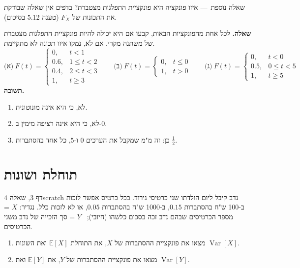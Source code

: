 \documentclass[11pt,a4paper]{report}
\newcommand{\E}{\mathbb{E}}
\DeclareMathOperator{\Var}{Var}
\newcommand{\dash}{{\rmfamily —}}
\begin{document}
\begin{suggestion}{שאלה נוספת~\dash{} איזו פונקציה היא פונקציית התפלגות מצטברת?}
בדפים אין שאלה שבודקת את התכונות של $F_X$ (טענה 5.12 בסיכום).

\textbf{שאלה.} לכל אחת מהפונקציות הבאות, קבעו אם היא יכולה להיות פונקציית התפלגות מצטברת של משתנה מקרי. אם לא, נמקו איזו תכונה לא מתקיימת.
\[
  \text{(א)}\ F(t)=\begin{cases}0,&t<1\\ 0.6,&1\le t<2\\ 0.4,&2\le t<3\\ 1,&t\ge3\end{cases}
  \qquad
  \text{(ב)}\ F(t)=\begin{cases}0,&t\le0\\ 1,&t>0\end{cases}
  \qquad
  \text{(ג)}\ F(t)=\begin{cases}0,&t<0\\ 0.5,&0\le t<5\\ 1,&t\ge5\end{cases}
\]
\textbf{תשובה.}
\begin{enumerate}[label=(\alph*),itemsep=1pt,topsep=2pt]
  \item לא, כי היא אינה מונוטונית.
  \item לא, כי היא אינה רציפה מימין ב-$0$.
  \item כן: זה מ"מ שמקבל את הערכים $0$ ו-$5$, כל אחד בהסתברות $\frac12$.
\end{enumerate}
\end{suggestion}

\chapter{תוחלת ושונות}

\begin{exercise}{דף 3, שאלה 4}{scratch}
נדב קיבל ליום הולדתו שני כרטיסי גירוד. בכל כרטיס אפשר לזכות ב-100 ש"ח בהסתברות $0.15$, ב-1000 ש"ח בהסתברות $0.05$, או לא לזכות כלל. נגדיר:
$X$ = מספר הכרטיסים שבהם נדב זכה בסכום כלשהו (חיובי); \ $Y$ = סך הזכייה של נדב משני הכרטיסים.
\begin{enumerate}[label=(\alph*)]
  \item מצאו את פונקציית ההסתברות של $X$, את התוחלת $\E[X]$ ואת השונות $\Var[X]$.
  \item מצאו את פונקציית ההסתברות של $Y$, את $\E[Y]$ ואת $\Var[Y]$.
\end{enumerate}
\end{exercise}
\end{document}
